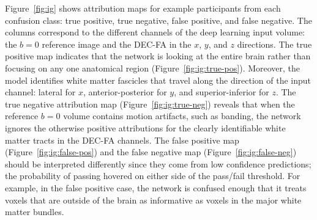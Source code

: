 \documentclass[9pt,lineno]{elife}
\begin{document}
Figure~\ref{fig:ig} shows attribution maps for example participants from each
confusion class: true positive, true negative, false positive, and false
negative. The columns correspond to the different channels of the deep learning
input volume: the $b=0$ reference image and the DEC-FA in the $x$, $y$, and $z$
directions. 
The true positive map indicates that the network is looking at the
entire brain rather than focusing on any one anatomical region
(Figure~\ref{fig:ig:true-pos}). Moreover, the model identifies white matter
fascicles that travel along the direction of the input channel: lateral for $x$,
anterior-posterior for $y$, and superior-inferior for $z$. The true negative
attribution map (Figure~\ref{fig:ig:true-neg}) reveals that when the reference
$b=0$ volume contains motion artifacts, such as banding, the network ignores the
otherwise positive attributions for the clearly identifiable white matter tracts
in the DEC-FA channels. The false positive map (Figure~\ref{fig:ig:false-pos})
and the false negative map (Figure~\ref{fig:ig:false-neg}) should be interpreted
differently since they come from low confidence predictions; the probability of
passing hovered on either side of the pass/fail threshold. For example, in the
false positive case, the network is confused enough that it treats voxels that
are outside of the brain as informative as voxels in the major white matter
bundles.
\end{document}

